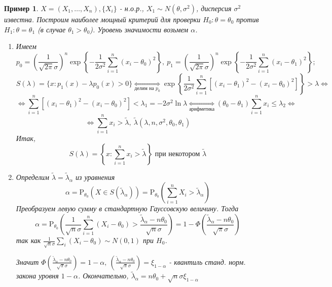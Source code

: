 \documentclass[12pt]{article}
\newtheorem*{example}{Пример}
\theoremstyle{basic_theorem}
\theoremstyle{name_theorem}
\def\P{
    \mathrm{P}
}
\begin{document}
\begin{example}
    $X = (X_1,\ldots, X_n), \{X_i\}$ - н.о.р., $X_1 \sim N(\theta, \sigma^2)$,
    дисперсия $\sigma^2$ известна. Построим наиболее мощный критерий
    для проверки $H_0: \theta = \theta_0$ против $H_1: \theta = \theta_1$
    (в случае $\theta_1 > \theta_0$). Уровень значимости возьмем $\alpha$.
    \begin{enumerate}
        \item Имеем 
        $$p_0 = \left(\frac{1}{\sqrt{2\pi}\sigma}\right)^n \exp{\left\{-\frac{1}{2\sigma^2} \sum^n_{i=1} (x_i -\theta_0)^2\right\}},\ 
        p_1 = \left(\frac{1}{\sqrt{2\pi}\sigma}\right)^n \exp{\left\{-\frac{1}{2\sigma^2} \sum^n_{i=1} (x_i -\theta_1)^2\right\}};$$
        $$S(\lambda) = \{x:p_1(x) - \lambda p_0(x) > 0\} \underset{\text{делим на }p_0}{\Leftrightarrow}
        \exp{\left\{\frac{1}{2\sigma^2}\sum_{i=1}^n\left[ (x_i-\theta_1)^2 -(x_i-\theta_0)^2 \right]\right\}} > \lambda\Leftrightarrow$$
        $$\Leftrightarrow \sum_{i=1}^n\left[(x_i - \theta_1)^2 - (x_i - \theta_0)^2\right] < \lambda_1 = -2\sigma^2\ln\lambda
        \underset{\text{арифметика}}{\Leftrightarrow} (\theta_0 - \theta_1)\sum_{i=1}^n x_i \leq\lambda_2 \Leftrightarrow$$
        $$\Leftrightarrow \sum_{i=1}^n x_i > \widetilde{\lambda},\ \widetilde{\lambda}(\lambda, n, \sigma^2, \theta_0, \theta_1)$$
        Итак,
        $$S(\lambda) = \left\{x: \sum_{i=1}^n x_i > \widetilde{\lambda}\right\} \text{ при некотором } \widetilde{\lambda}$$

        \item Определим $\widetilde{\lambda} = \widetilde{\lambda}_\alpha$ 
            из уравнения
            $$\alpha = \P_{\theta_0}(X \in S(\widetilde{\lambda}_\alpha)) = 
            \P_{\theta_0}\left(\sum_{i=1}^n X_i > \widetilde{\lambda}_\alpha\right)$$
            Преобразуем левую сумму в стандартную Гауссовскую величину. Тогда
            $$\alpha = \P_{\theta_0}\left(\frac{1}{\sqrt{n} \sigma} \sum_{i=1}^n(X_i - \theta_0) > \frac{\widetilde{\lambda}_\alpha - n\theta_0}{\sqrt{n}\sigma}\right)=
            1 - \Phi\left(\frac{\widetilde{\lambda}_\alpha - n\theta_0}{\sqrt{\pi}\sigma}\right)$$
            так как $\frac{1}{\sqrt{n}\sigma}\sum_{i} (X_i - \theta_0) \sim N(0, 1)$ при $H_0$.
            
            Значит $\Phi\left(\frac{\widetilde{\lambda}_\alpha - n\theta_0}{\sqrt{\pi}\sigma}\right) = 1 - \alpha,\
            \left(\frac{\widetilde{\lambda}_\alpha - n\theta_0}{\sqrt{\pi}\sigma}\right) = \xi_{1-\alpha}$
             - квантиль станд. норм. закона уровня $1 - \alpha$.
            Окончательно, $\widetilde{\lambda}_\alpha = n\theta_0 + \sqrt{n}\sigma \xi_{1-\alpha}$


\end{enumerate}
\end{example}
\end{document}
